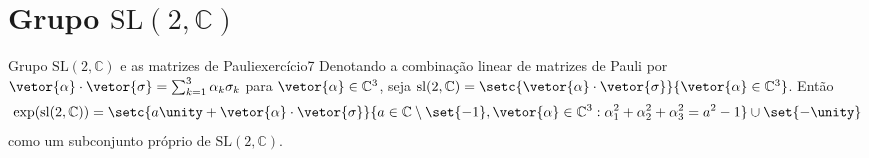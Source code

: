 \section[Grupo SL(2, C)]{Grupo \(\mathrm{SL}(2, \mathbb{C})\)}
\begin{proposition}{Grupo \(\mathrm{SL}(2, \mathbb{C})\) e as matrizes de Pauli}{exercício7}
    Denotando a combinação linear de matrizes de Pauli por \(\vetor{\alpha} \cdot \vetor{\sigma} = \sum_{k = 1}^3 \alpha_k \sigma_k\) para \(\vetor{\alpha} \in \mathbb{C}^3\), seja \(\mathrm{sl}(2,\mathbb{C}) = \setc{\vetor{\alpha}\cdot\vetor{\sigma}}{\vetor{\alpha}\in \mathbb{C}^3}\). Então
    \begin{equation*}
        \exp(\mathrm{sl}(2,\mathbb{C})) = \setc{a\unity + \vetor{\alpha}\cdot\vetor{\sigma}}{a \in \mathbb{C}\setminus\set{-1}, \vetor{\alpha} \in \mathbb{C}^3 : \alpha_1^2 + \alpha_2^2 + \alpha_3^2 = a^2 - 1}\cup\set{-\unity}
    \end{equation*}
    como um subconjunto próprio de \(\mathrm{SL}(2,\mathbb{C})\).
\end{proposition}
